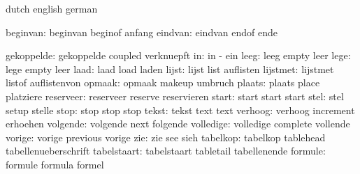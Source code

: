 \stopsetupvariables




\startelements        dutch                english             german

           beginvan:  beginvan             beginof             anfang
            eindvan:  eindvan              endof               ende

         gekoppelde:  gekoppelde           coupled             verknuepft
                 in:  in                   -                   ein  
               leeg:  leeg                 empty               leer
               lege:  lege                 empty               leer
               laad:  laad                 load                laden
              lijst:  lijst                list                auflisten
           lijstmet:  lijstmet             listof              auflistenvon
             opmaak:  opmaak               makeup              umbruch
             plaats:  plaats               place               platziere
          reserveer:  reserveer            reserve             reservieren
              start:  start                start               start
               stel:  stel                 setup               stelle
               stop:  stop                 stop                stop
              tekst:  tekst                text                text
            verhoog:  verhoog              increment           erhoehen
           volgende:  volgende             next                folgende
          volledige:  volledige            complete            vollende
             vorige:  vorige               previous            vorige
                zie:  zie                  see                 sieh
           tabelkop:  tabelkop             tablehead           tabellenueberschrift
        tabelstaart:  tabelstaart          tabletail           tabellenende
            formule:  formule              formula             formel

\stopelements




